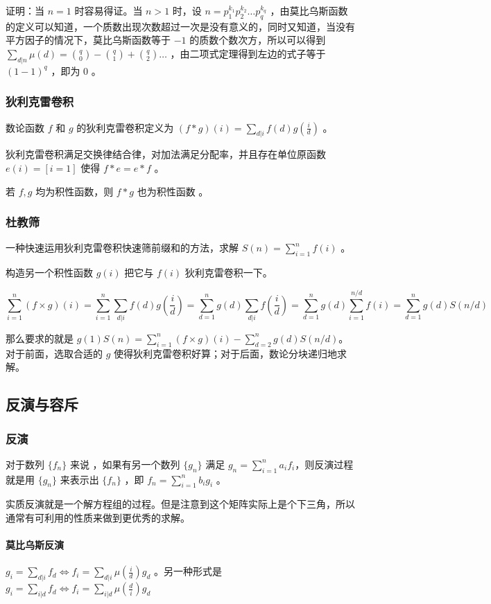 \documentclass[UTF-8]{ctexart}
\begin{document}
	证明：当 $n=1$ 时容易得证。当 $n > 1$ 时，设 $n=p _ 1 ^ {k _ 1} p _ 2 ^ {k _ 2} \dots p _ q ^ {k _ q}$ ，由莫比乌斯函数的定义可以知道，一个质数出现次数超过一次是没有意义的，同时又知道，当没有平方因子的情况下，莫比乌斯函数等于 $-1$ 的质数个数次方，所以可以得到 $\sum _ {d|n} \mu(d)= \binom{q}{0}-\binom{q}{1}+\binom{q}{2} \dots $ ，由二项式定理得到左边的式子等于 $(1-1) ^ q$ ，即为 $0$ 。
	\subsubsection{狄利克雷卷积}
	数论函数 $f$ 和 $g$ 的狄利克雷卷积定义为 $(f * g)(i)=\sum _ {d|i} f(d)g(\frac{i}{d})$ 。
	
	狄利克雷卷积满足交换律结合律，对加法满足分配率，并且存在单位原函数 $e(i)=[i=1]$ 使得 $f * e=e * f$ 。  
	
	若 $f,g$ 均为积性函数，则 $f * g$ 也为积性函数 。
	\subsubsection{杜教筛}
	一种快速运用狄利克雷卷积快速筛前缀和的方法，求解 $S(n)=\sum_{i=1}^n f(i)$ 。
	
	构造另一个积性函数 $g(i)$ 把它与 $f(i)$ 狄利克雷卷积一下。
	
	$$\sum_{i=1}^n (f\times g)(i)=\sum_{i=1}^n \sum_{d|i} f(d)g(\frac{i}{d}) 
	=\sum_{d=1}^n g(d) \sum_{d|i} f(\frac{i}{d}) =\sum_{d=1}^{n} g(d)\sum_{i=1}^{n/d} f(i)=\sum_{d=1}^n g(d)S(n/d)$$
	
	那么要求的就是 $g(1)S(n)=\sum_{i=1}^n (f\times g)(i)-\sum_{d=2}^n g(d)S(n/d)$。对于前面，选取合适的 $g$ 使得狄利克雷卷积好算；对于后面，数论分块递归地求解。
	
	\subsection{反演与容斥}
	\subsubsection{反演}
	对于数列 $\{f_n\}$ 来说	，如果有另一个数列 $\{g_n\}$ 满足 $g_n=\sum_{i=1}^n a_i f_i$，则反演过程就是用 $\{g_n\}$ 来表示出 $\{f_n\}$ ，即 $f_n=\sum_{i=1}^n b_i g_i$ 。
	
	实质反演就是一个解方程组的过程。但是注意到这个矩阵实际上是个下三角，所以通常有可利用的性质来做到更优秀的求解。
	
	\paragraph{莫比乌斯反演} $g_i=\sum_{d|i} f_d \Leftrightarrow f_i=\sum_{d|i} \mu(\frac{i}{d}) g_d$ 。另一种形式是 $g_i=\sum_{i|d} f_d\Leftrightarrow f_i=\sum_{i|d} \mu(\frac{d}{i}) g_d$
	
\end{document}
